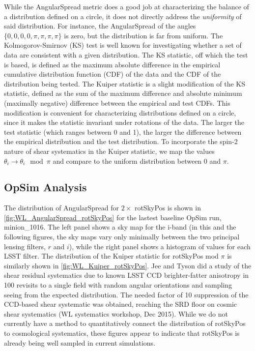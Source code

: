 While the AngularSpread metric does a good job at characterizing the balance of
a distribution defined on a circle, it does not directly address the {\emph
{uniformity}} of said distribution.  For instance, the AngularSpread of the
angles $\{0, 0, 0, 0, \pi, \pi, \pi, \pi\}$ is zero, but the distribution is far
from uniform.  The Kolmogorov-Smirnov (KS) test is well known for investigating
whether a set of data are consistent with a given distribution.  The KS
statistic, off which the test is based, is defined as the maximum absolute
difference in the empirical cumulative distribution function (CDF) of the data
and the CDF of the distribution being tested.  The Kuiper statistic is a slight
modification of the KS statistic, defined as the sum of the maximum difference
and absolute minimum (maximally negative) difference between the empirical and
test CDFs.  This modification is convenient for characterizing distributions
defined on a circle, since it makes the statistic invariant under rotations of
the data.  The larger the test statistic (which ranges between 0 and 1), the
larger the difference between the empirical distribution and the test
distribution.  To incorporate the spin-2 nature of shear systematics in the
Kuiper statistic, we map the values $\theta_i \rightarrow \theta_i \mod \pi$ and
compare to the uniform distribution between 0 and $\pi$.


\subsection{OpSim Analysis}

The distribution of AngularSpread for $2 \times$ rotSkyPos is shown in
\autoref{fig:WL_AngularSpread_rotSkyPos} for the lastest baseline OpSim run,
minion\_1016.  The left panel shows a sky map for the i-band (in this and the
following figures, the sky maps vary only minimally between the two principal
lensing filters, $r$ and $i$), while the right panel shows a histogram of values
for each LSST filter.  The distribution of the Kuiper statistic for rotSkyPos
mod $\pi$ is similarly shown in \autoref{fig:WL_Kuiper_rotSkyPos}. Jee and Tyson
did a study of the shear residual systematics due to known LSST CCD
brighter-fatter anisotropy in 100 revisits to a single field with random angular
orientations and sampling seeing from the expected distribution.  The needed
factor of 10 suppression of the CCD-based shear systematic was obtained,
reaching the SRD floor on cosmic shear systematics (WL systematics workshop, Dec
2015).    While we do not currently have a method to quantitatively connect the
distribution of rotSkyPos to cosmological systematics, these figures appear to
indicate that rotSkyPos is already being well sampled in current simulations.

